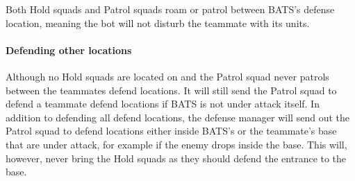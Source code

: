 Both Hold squads and Patrol squads roam or patrol between BATS’s defense location, meaning the bot
will not disturb the teammate with its units.

\paragraph{Defending other locations}
Although no Hold squads are located on and the Patrol squad never patrols between the teammates
defend locations. It will still send the Patrol squad to defend a teammate defend locations if BATS
is not under attack itself. In addition to defending all defend locations, the defense manager will
send out the Patrol squad to defend locations either inside BATS’s or the teammate's base that are
under attack, for example if the enemy drops inside the base. This will, however, never bring the
Hold squads as they should defend the entrance to the base.
